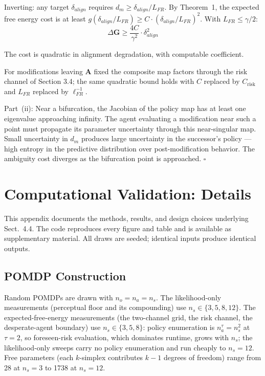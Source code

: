 \documentclass[runningheads]{llncs}
\begin{document}
Inverting: any target $\delta_{align}$ requires $d_m \geq \delta_{align}/L_{FR}$. By Theorem~1, the expected free energy cost is at least $g(\delta_{align}/L_{FR}) \geq C \cdot (\delta_{align}/L_{FR})^2$. With $L_{FR} \leq \gamma/2$:
\begin{equation}
\Delta\mathbf{G} \geq \frac{4C}{\gamma^2} \cdot \delta_{align}^2
\end{equation}

The cost is quadratic in alignment degradation, with computable coefficient.

For modifications leaving $\mathbf{A}$ fixed the composite map factors through the risk channel of Section 3.4; the same quadratic bound holds with $C$ replaced by $C_{\text{risk}}$ and $L_{FR}$ replaced by $\ell_{FR}^{-1}$.

Part~(ii): Near a bifurcation, the Jacobian of the policy map has at least one eigenvalue approaching infinity. The agent evaluating a modification near such a point must propagate its parameter uncertainty through this near-singular map. Small uncertainty in $d_m$ produces large uncertainty in the successor's policy --- high entropy in the predictive distribution over post-modification behavior. The ambiguity cost diverges as the bifurcation point is approached. $\square$

\section{Computational Validation: Details}\label{app:validation}
 
This appendix documents the methods, results, and design choices
underlying Sect.~4.4. The code reproduces every figure
and table and is available as supplementary material. All draws are
seeded; identical inputs produce identical outputs.
 
\subsection{POMDP Construction}\label{app:pomdp}
 
Random POMDPs are drawn with $n_o = n_a = n_s$. The likelihood-only
measurements (perceptual floor and its compounding) use
$n_s \in \{3, 5, 8, 12\}$. The expected-free-energy measurements (the
two-channel grid, the risk channel, the desperate-agent boundary) use
$n_s \in \{3, 5, 8\}$: policy enumeration is $n_a^\tau = n_s^2$ at
$\tau = 2$, so foreseen-risk evaluation, which dominates runtime, grows
with $n_s$; the likelihood-only sweeps carry no policy enumeration and
run cheaply to $n_s = 12$. Free parameters (each $k$-simplex contributes
$k - 1$ degrees of freedom) range from 28 at $n_s = 3$ to 1738 at
$n_s = 12$.
 
\end{document}
